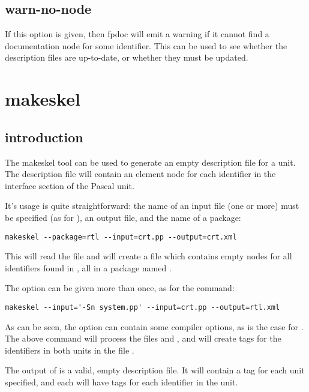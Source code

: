 \subsection{warn-no-node}
\label{suse:warnnonode}
If this option is given, then fpdoc will emit a warning if it cannot find a
documentation node for some identifier. This can be used to see whether the
description files are up-to-date, or whether they must be updated.

\section{makeskel}
\label{se:makeskel}

\subsection{introduction}
\label{suse:makeskelintro}
The makeskel tool can be used to generate an empty description file 
for a unit. The description file will contain an element node for each
identifier in the interface section of the Pascal unit. 

It's usage is quite straightforward: the name of an input file 
(one or more) must be specified (as for \fpdoc), an output file,
and the name of a package:
\begin{verbatim}
makeskel --package=rtl --input=crt.pp --output=crt.xml
\end{verbatim}
This will read the file  and will create a file 
which contains empty nodes for all identifiers found in , all
in a package named .

The  option can be given more than once, as for the 
command:
\begin{verbatim}
makeskel --input='-Sn system.pp' --input=crt.pp --output=rtl.xml
\end{verbatim}
As can be seen, the  option can contain some compiler options,
as is the case for \fpdoc. The above command will process the files
 and , and will create  tags 
for the identifiers in both units in the file .

The output of  is a valid, empty description file. It will
contain a  tag for each unit specified, and each 
will have  tags for each identifier in the unit. 

